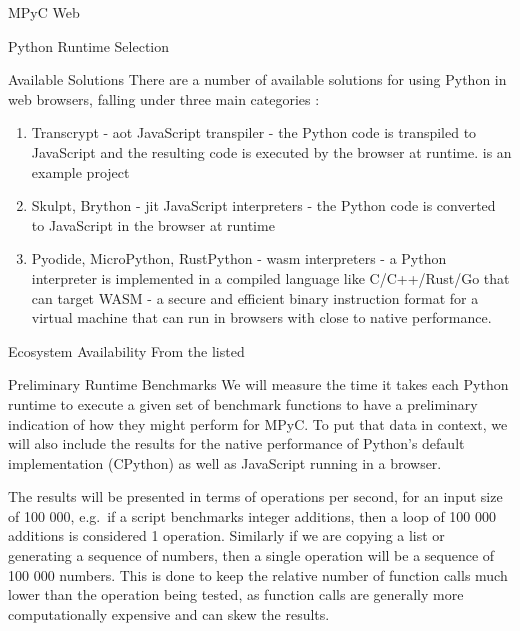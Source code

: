 \begin{block}{MPyC Web}
\begin{block}{Python Runtime Selection}
\begin{block}{Available Solutions}
\label{thesis__090-mpyc-web.md__available-solutions}
There are a number of available solutions for using Python in web browsers, falling under three main categories\autocite{pyodideIntroMozilla} \autocite{anvilPythonBrowser}:

\begin{enumerate}
\tightlist
\item
  Transcrypt\autocite{transcryptRepo} - \gls{aot} JavaScript transpiler - the Python code is transpiled to JavaScript and the resulting code is executed by the browser at runtime. is an example project
\item
  Skulpt\autocite{skulptDocs}, Brython\autocite{brythonDocs} - \gls{jit} JavaScript interpreters - the Python code is converted to JavaScript in the browser at runtime
\item
  Pyodide\autocite{pyodideDocs}, MicroPython\autocite{microPythonDocs}, RustPython\autocite{rustPythonDocs} - \gls{wasm}\autocite{wasmDocs} interpreters - a Python interpreter is implemented in a compiled language like C/C++/Rust/Go that can target WASM - a secure and efficient binary instruction format for a virtual machine that can run in browsers with close to native performance.
\end{enumerate}
\end{block}

\begin{block}{Ecosystem Availability}
\label{thesis__090-mpyc-web.md__ecosystem-availability}
From the listed
\end{block}

\begin{block}{Preliminary Runtime Benchmarks}
\label{thesis__090-mpyc-web.md__preliminary-runtime-benchmarks}
We will measure the time it takes each Python runtime to execute a given set of benchmark functions to have a preliminary indication of how they might perform for MPyC. To put that data in context, we will also include the results for the native performance of Python's default implementation (CPython) as well as JavaScript running in a browser.

The results will be presented in terms of operations per second, for an input size of 100 000, e.g.~if a script benchmarks integer additions, then a loop of 100 000 additions is considered 1 operation. Similarly if we are copying a list or generating a sequence of numbers, then a single operation will be a sequence of 100 000 numbers. This is done to keep the relative number of function calls much lower than the operation being tested, as function calls are generally more computationally expensive and can skew the results.


\end{block}
\end{block}
\end{block}

